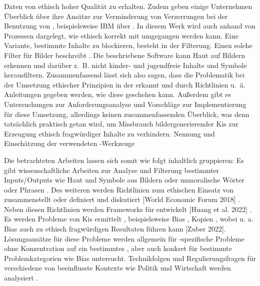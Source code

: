 Daten von ethisch hoher Qualität zu erhalten.
Zudem geben einige Unternehmen Überblick über ihre Ansätze zur Verminderung von Verzerrungen bei der Benutzung von , 
beispielsweise IBM über \cite{Hobson}. In diesem Werk wird auch anhand von Prozessen dargelegt, wie ethisch korrekt mit  
umgegangen werden kann.
Eine Variante, bestimmte Inhalte zu blockieren, besteht in der Filterung. Einen solche Filter für Bilder beschreibt \cite{Zheng}.
Die beschriebene Software kann Haut auf Bildern erkennen und darüber z. B. nicht kinder- und jugendfreie Inhalte und Symbole herausfiltern.
Zusammenfassend lässt sich also sagen, dass die Problematik bei der Umsetzung ethischer Prinzipien in der  erkannt und
durch Richtlinien u. ä. Anleitungen gegeben werden, wie diese geschehen kann. Außerdem gibt es Untersuchungen 
zur Anforderungsanalyse und Vorschläge zur Implementierung für diese Umsetzung, allerdings keinen zusammenfassenden 
Überblick, was denn tatsächlich praktisch getan wird, um Missbrauch bildergenerierender Kis zur Erzeugung ethisch 
fragwürdiger Inhalte zu verhindern.
Nennung und Einschätzung der verwendeten -Werkzeuge

Die betrachteten Arbeiten lassen sich somit wie folgt inhaltlich gruppieren: Es gibt wissenschaftliche Arbeiten zur Analyse und Filterung
bestimmter Inputs/Outputs wie Haut und Symbole aus Bildern \cite{Zheng} oder unmoralische Wörter oder Phrasen \cite{Shah}. Des weiteren 
werden Richtlinien zum ethischen Einsatz von  zusammenstellt oder definiert und diskutiert \cite{Ayling} \cite{Srinivasan} 
\cite{Jameel} \cite{Hagendorff} \cite{Jobin} \cite{Unity} \cite{EUCommision}[World Economic Forum 2018] \cite{Mueller}.
Neben diesen Richtlinien werden Frameworks für  entwickelt [Huang et al. 2022] \cite{Mueller}. Es werden Probleme von Kis ermittelt \cite{Ayling}, 
beispielsweise Bias \cite{Salminen} \cite{Jameel}, Kopien \cite{Somepalli}, wobei u. a. Bias auch zu ethisch 
fragwürdigen Resultaten führen kann [Zuber 2022]. Lösungsansätze für diese Probleme werden allgemein für -spezifische Probleme ohne 
Konzentration auf ein bestimmtes \cite{Ayling} \cite{Avelar}, aber auch konkret für bestimmte Problemkategorien wie Bias \cite{Srinivasan}
\cite{Jameel}untersucht. Technikfolgen und Regulierungsfragen für verschiedene von  beeinflusste Kontexte wie Politik und Wirtschaft
werden analysiert \cite{Pawelec}.
